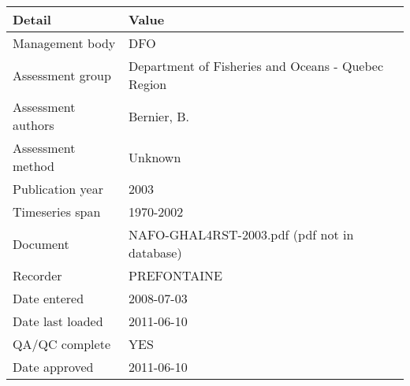 \begin{table}[htb]
\centering
\begin{tabular}{lp{7cm}}
\toprule
Detail & Value \\
\midrule
Management body    & DFO                                                \\
Assessment group   & Department of Fisheries and Oceans - Quebec Region \\
Assessment authors & Bernier, B.                                        \\
Assessment method  & Unknown                                            \\
Publication year   & 2003                                               \\
Timeseries span    & 1970-2002                                          \\
Document           & NAFO-GHAL4RST-2003.pdf (pdf not in database)       \\
Recorder           & PREFONTAINE                                        \\
Date entered       & 2008-07-03                                         \\
Date last loaded   & 2011-06-10                                         \\
QA/QC complete     & YES                                                \\
Date approved      & 2011-06-10                                         \\
\bottomrule
\end{tabular}
\label{tab:assessdet}
\end{table}
